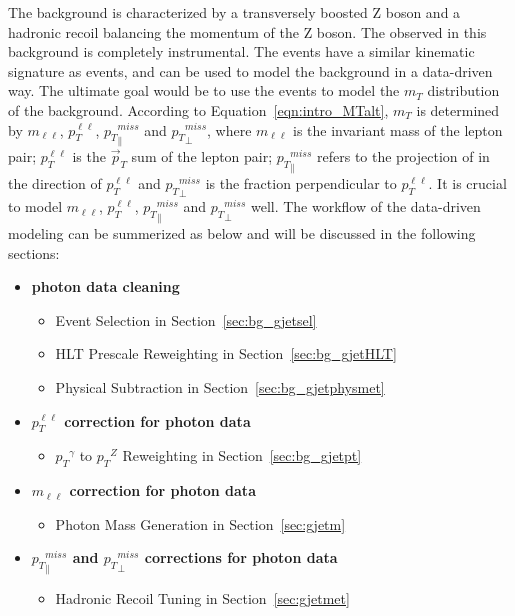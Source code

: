 \vspace{0.3cm}
The \Zjets background is characterized by a transversely boosted Z boson and a hadronic recoil balancing the momentum of the Z boson. The observed \ptmiss in this background is completely instrumental. The \gjets events have a similar kinematic signature as \Zjets events, and can be used to model the \Zjets background in a data-driven way. The ultimate goal would be to use the \gjets events to model the $m_T$ distribution of the \Zjets background. According to Equation~\ref{eqn:intro_MTalt}, $m_T$ is determined by $m_{\ell\ell}$, ${p}_{T}^{\ell\ell}$, ${p_{T}}^{miss}_\parallel$ and ${p_{T}}^{miss}_\perp$, where $m_{\ell\ell}$ is the invariant mass of the lepton pair; ${p}_{T}^{\ell\ell}$ is the $\vec p_T$ sum of the lepton pair; ${p_{T}}^{miss}_\parallel$ refers to the projection of \ptmiss in the direction of ${p}_{T}^{\ell\ell}$ and ${p_{T}}^{miss}_\perp$ is the fraction perpendicular to ${p}_{T}^{\ell\ell}$. It is crucial to model $m_{\ell\ell}$, ${p}_{T}^{\ell\ell}$, ${p_{T}}^{miss}_\parallel$ and ${p_{T}}^{miss}_\perp$ well. The workflow of the \Zjets data-driven modeling can be summerized as below and will be discussed in the following sections:
\begin{itemize}
\item \textbf{photon data cleaning}
\begin{itemize}
\item \gjets Event Selection in Section~\ref{sec:bg_gjetsel}
\item \gjets HLT Prescale Reweighting in Section~\ref{sec:bg_gjetHLT}
\item Physical \ptmiss Subtraction in Section~\ref{sec:bg_gjetphysmet}
\end{itemize}
\item \textbf{${p}_{T}^{\ell\ell}$ correction for photon data}
\begin{itemize}
\item ${p_T}^{\gamma}$ to ${p_T}^Z$ Reweighting in Section~\ref{sec:bg_gjetpt}
\end{itemize}
\item \textbf{$m_{\ell\ell}$ correction for photon data}
\begin{itemize}
\item Photon Mass Generation in Section~\ref{sec:gjetm}
\end{itemize}
\item \textbf{${p_{T}}^{miss}_\parallel$ and ${p_{T}}^{miss}_\perp$ corrections for photon data}
\begin{itemize}
\item \ptmiss Hadronic Recoil Tuning in Section~\ref{sec:gjetmet}
\end{itemize}
\end{itemize}

